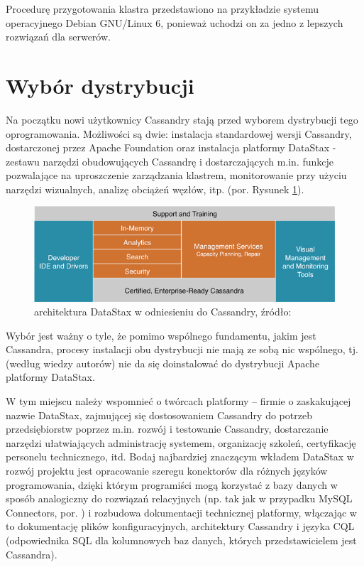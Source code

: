 \documentclass{article}
\begin{document}
Procedurę przygotowania klastra przedstawiono na przykładzie systemu operacyjnego Debian GNU/Linux 6, ponieważ uchodzi on za jedno z lepszych rozwiązań dla serwerów.

\section{Wybór dystrybucji}

Na początku nowi użytkownicy Cassandry stają przed wyborem dystrybucji tego oprogramowania. Możliwości są dwie: instalacja standardowej wersji Cassandry, dostarczonej przez Apache Foundation oraz instalacja platformy DataStax - zestawu narzędzi obudowujących Cassandrę i dostarczających m.in. funkcje pozwalające na uproszczenie zarządzania klastrem, monitorowanie przy użyciu narzędzi wizualnych, analizę obciążeń węzłów, itp. (por. Rysunek \ref{datastax_arch}).

\begin{figure}[h]
\centering
\includegraphics[width=\linewidth]{gfx/datastax}
\caption{architektura DataStax w odniesieniu do Cassandry, źródło: \cite{whydatastax}}
\label{datastax_arch}
\end{figure}

Wybór jest ważny o tyle, że pomimo wspólnego fundamentu, jakim jest Cassandra, procesy instalacji obu dystrybucji nie mają ze sobą nic wspólnego, tj. (według wiedzy autorów) nie da się doinstalować do dystrybucji Apache platformy DataStax.

W tym miejscu należy wspomnieć o twórcach platformy -- firmie o zaskakującej nazwie DataStax, zajmującej się dostosowaniem Cassandry do potrzeb przedsiębiorstw poprzez m.in. rozwój i testowanie Cassandry, dostarczanie narzędzi ułatwiających administrację systemem, organizację szkoleń, certyfikację personelu technicznego, itd. Bodaj najbardziej znaczącym wkładem DataStax w rozwój projektu jest opracowanie szeregu konektorów dla różnych języków programowania, dzięki którym programiści mogą korzystać z bazy danych w sposób analogiczny do rozwiązań relacyjnych (np. tak jak w przypadku MySQL Connectors, por. \cite{mysql_connectors}) i rozbudowa dokumentacji technicznej platformy, włączając w to dokumentację plików konfiguracyjnych, architektury Cassandry i języka CQL (odpowiednika SQL dla kolumnowych baz danych, których przedstawicielem jest Cassandra).
\end{document}
